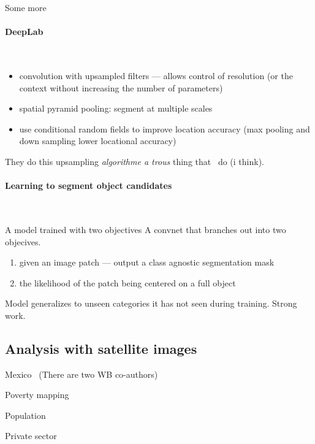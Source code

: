 \documentclass[12pt, a4paper, oneside, headinclude, footinclude]{article}
\begin{document}
Some more~\cite{chen2018, NIPS2015_5852}

\paragraph{DeepLab}~\cite{chen2018}

\begin{itemize}
    \item convolution with upsampled filters --- allows control of resolution
        (or the context without increasing the number of parameters)
    \item spatial pyramid pooling: segment at multiple scales
    \item use conditional random fields to improve location accuracy (max
        pooling and down sampling lower locational accuracy)
\end{itemize}

They do this upsampling \textit{algorithme a trous} thing that~\cite{NIPS2015_5852}
do (i think).

\paragraph{Learning to segment object candidates}~\cite{NIPS2015_5852}

A model trained with two objectives
A convnet that branches out into two objecives.

\begin{enumerate}
    \item given an image patch ---  output a class agnostic segmentation mask
    \item the likelihood of the patch being centered on a full object
\end{enumerate}

Model generalizes to unseen categories it has not seen during training. Strong
work.



\subsection{Analysis with satellite images}

Mexico~\cite{babenko2017poverty} (There are two WB co-authors)

Poverty mapping~\cite{Jean790}

Population~\cite{doupe2016, robinson2017}

Private sector~\cite{facebook, cnn_orbital}
\end{document}
